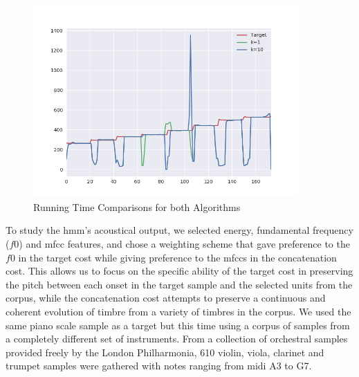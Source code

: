 {{{{{{{{\begin{figure}
	\begin{center}
		\includegraphics[width=0.9\textwidth]{ch05_pyconcat/figures/fundamental.png}
	\end{center}
	\caption[Running Time Comparisons for both Algorithms]{Running Time Comparisons for both Algorithms}
	\label{fig:fundamental}
\end{figure}

To study the \acrshort{hmm}’s acoustical output, we selected energy, fundamental frequency ($f0$) and \acrshort{mfcc} features, and chose a weighting scheme that gave preference to the $f0$ in the target cost while giving preference to the \acrshort{mfcc}s in the concatenation cost. This allows us to focus on the specific ability of the target cost in preserving the pitch between each onset in the target sample and the selected units from the corpus, while the concatenation cost attempts to preserve a continuous and coherent evolution of timbre from a variety of timbres in the corpus. We used the same piano scale sample as a target but this time using a corpus of samples from a completely different set of instruments. From a collection of orchestral samples provided freely by the London Philharmonia, 610 violin, viola, clarinet and trumpet samples were gathered with notes ranging from \acrshort{midi} A3 to G7.

}}}}}}}}
